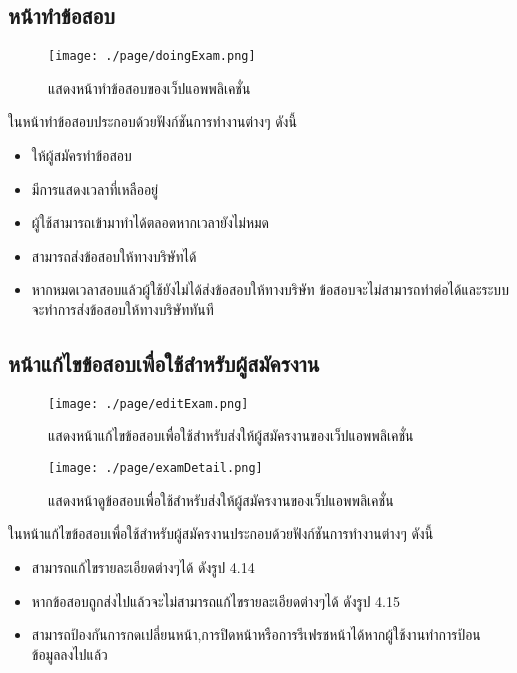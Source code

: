 \subsection{หน้าทำข้อสอบ}
\begin{figure}[H]
  \centering
  \texttt{[image: ./page/doingExam.png]}
  \caption{แสดงหน้าทำข้อสอบของเว็ปแอพพลิเคชั่น}
  \label{Fig:doingExam}
\end{figure}
ในหน้าทำข้อสอบประกอบด้วยฟังก์ชันการทำงานต่างๆ ดังนี้
\begin{itemize}
  \item ให้ผู้สมัครทำข้อสอบ
  \item มีการแสดงเวลาที่เหลืออยู่
  \item ผู้ใช้สามารถเข้ามาทำได้ตลอดหากเวลายังไม่หมด
  \item สามารถส่งข้อสอบให้ทางบริษัทได้
  \item หากหมดเวลาสอบแล้วผู้ใช้ยังไม่ได้ส่งข้อสอบให้ทางบริษัท ข้อสอบจะไม่สามารถทำต่อได้และระบบจะทำการส่งข้อสอบให้ทางบริษัททันที
\end{itemize}

\subsection{หน้าแก้ไขข้อสอบเพื่อใช้สำหรับผู้สมัครงาน}
\begin{figure}[H]
  \centering
  \texttt{[image: ./page/editExam.png]}
  \caption{แสดงหน้าแก้ไขข้อสอบเพื่อใช้สำหรับส่งให้ผู้สมัครงานของเว็ปแอพพลิเคชั่น}
  \label{Fig:editExam}
\end{figure}
\begin{figure}[H]
  \centering
  \texttt{[image: ./page/examDetail.png]}
  \caption{แสดงหน้าดูข้อสอบเพื่อใช้สำหรับส่งให้ผู้สมัครงานของเว็ปแอพพลิเคชั่น}
  \label{Fig:examDetail}
\end{figure}
ในหน้าแก้ไขข้อสอบเพื่อใช้สำหรับผู้สมัครงานประกอบด้วยฟังก์ชันการทำงานต่างๆ ดังนี้
\begin{itemize}
    \item สามารถแก้ไขรายละเอียดต่างๆได้ ดังรูป 4.14
    \item หากข้อสอบถูกส่งไปแล้วจะไม่สามารถแก้ไขรายละเอียดต่างๆได้ ดังรูป 4.15
    \item สามารถป้องกันการกดเปลี่ยนหน้า,การปิดหน้าหรือการรีเฟรชหน้าได้หากผู้ใช้งานทําการป้อน ข้อมูลลงไปแล้ว
\end{itemize}

